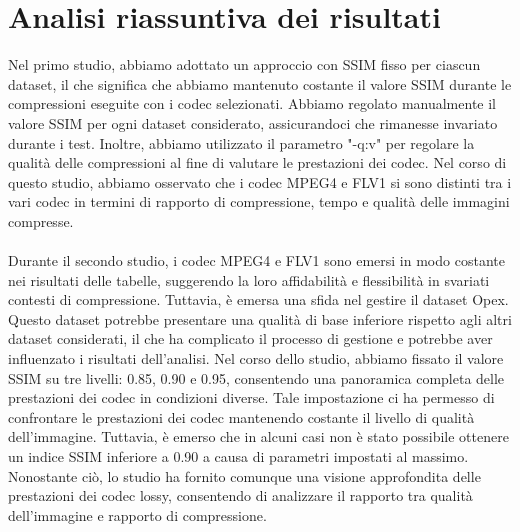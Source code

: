 \clearpage

\section{Analisi riassuntiva dei risultati}

Nel primo studio, abbiamo adottato un approccio con SSIM fisso per ciascun dataset, il che significa che abbiamo mantenuto costante il valore SSIM durante le compressioni eseguite con i codec selezionati. Abbiamo regolato manualmente il valore SSIM per ogni dataset considerato, assicurandoci che rimanesse invariato durante i test. Inoltre, abbiamo utilizzato il parametro "-q:v" per regolare la qualità delle compressioni al fine di valutare le prestazioni dei codec.
Nel corso di questo studio, abbiamo osservato che i codec MPEG4 e FLV1 si sono distinti tra i vari codec in termini di rapporto di compressione, tempo e qualità delle immagini compresse. 
\\
\\
Durante il secondo studio, i codec MPEG4 e FLV1 sono emersi in modo costante nei risultati delle tabelle, suggerendo la loro affidabilità e flessibilità in svariati contesti di compressione. Tuttavia, è emersa una sfida nel gestire il dataset Opex. Questo dataset potrebbe presentare una qualità di base inferiore rispetto agli altri dataset considerati, il che ha complicato il processo di gestione e potrebbe aver influenzato i risultati dell'analisi.
Nel corso dello studio, abbiamo fissato il valore SSIM su tre livelli: 0.85, 0.90 e 0.95, consentendo una panoramica completa delle prestazioni dei codec in condizioni diverse. Tale impostazione ci ha permesso di confrontare le prestazioni dei codec mantenendo costante il livello di qualità dell'immagine. Tuttavia, è emerso che in alcuni casi non è stato possibile ottenere un indice SSIM inferiore a 0.90 a causa di parametri impostati al massimo. Nonostante ciò, lo studio ha fornito comunque una visione approfondita delle prestazioni dei codec lossy, consentendo di analizzare il rapporto tra qualità dell'immagine e rapporto di compressione.
\clearpage
